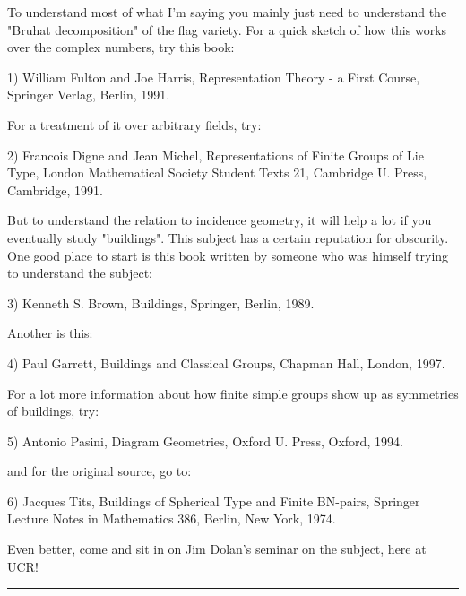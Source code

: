 To understand most of what I'm saying you mainly just need to understand
the "Bruhat decomposition" of the flag variety.  For a quick sketch of
how this works over the complex numbers, try this book:

1) William Fulton and Joe Harris, Representation Theory - a First
Course, Springer Verlag, Berlin, 1991.

For a treatment of it over arbitrary fields, try:

2) Francois Digne and Jean Michel, Representations of Finite Groups
of Lie Type, London Mathematical Society Student Texts 21, Cambridge
U. Press, Cambridge, 1991.

But to understand the relation to incidence geometry, it will
help a lot if you eventually study "buildings".  This subject has
a certain reputation for obscurity.  One good place to start is 
this book written by someone who was himself trying to understand
the subject:

3) Kenneth S. Brown, Buildings, Springer, Berlin, 1989.

Another is this:

4) Paul Garrett, Buildings and Classical Groups, Chapman \text{\&}  Hall,
London, 1997.

For a lot more information about how finite simple groups show up 
as symmetries of buildings, try:

5) Antonio Pasini, Diagram Geometries, Oxford U. Press, Oxford, 1994.

and for the original source, go to:

6) Jacques Tits, Buildings of Spherical Type and Finite BN-pairs,
Springer Lecture Notes in Mathematics 386, Berlin, New York, 1974.

Even better, come and sit in on Jim Dolan's seminar on the subject,
here at UCR!

\par\noindent\rule{\textwidth}{0.4pt}
